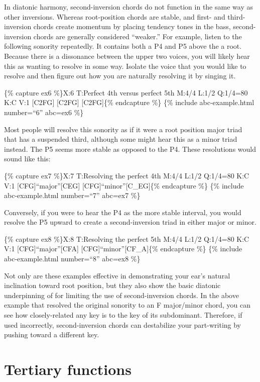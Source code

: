 \documentclass{book}
\begin{document}
In diatonic harmony, second-inversion chords do not function in the same way
as other inversions. Whereas root-position chords are stable, and first- and
third-inversion chords create momentum by placing tendency tones in the bass,
second-inversion chords are generally considered ``weaker.'' For example,
listen to the following sonority repeatedly. It contains both a P4 and P5
above the a root. Because there is a dissonance between the upper two voices,
you will likely hear this as wanting to resolve in some way. Isolate the voice
that you would like to resolve and then figure out how you are naturally
resolving it by singing it.

\{\% capture ex6 \%\}X:6 T:Perfect 4th versus perfect 5th M:4/4 L:1/2 Q:1/4=80
K:C V:1 {[}C2FG{]}\textbar{} {[}C2FG{]}\textbar{} {[}C2FG{]}\textbar{]}\{\%
endcapture \%\} \{\% include abc-example.html number=``6'' abc=ex6 \%\}

Most people will resolve this sonority as if it were a root position major
triad that has a suspended third, although some might hear this as a minor
triad instead. The P5 seems more stable as opposed to the P4. These
resolutions would sound like this:

\{\% capture ex7 \%\}X:7 T:Resolving the perfect 4th M:4/4 L:1/2 Q:1/4=80 K:C
V:1 {[}CFG{]}``major''{[}CEG{]}\textbar{}
{[}CFG{]}``minor''{[}C\_EG{]}\textbar{]}\{\% endcapture \%\} \{\% include
abc-example.html number=``7'' abc=ex7 \%\}

Conversely, if you were to hear the P4 as the more stable interval, you would
resolve the P5 upward to create a second-inversion triad in either major or
minor.

\{\% capture ex8 \%\}X:8 T:Resolving the perfect 5th M:4/4 L:1/2 Q:1/4=80 K:C
V:1 {[}CFG{]}``major''{[}CFA{]}\textbar{}
{[}CFG{]}``minor''{[}CF\_A{]}\textbar{]}\{\% endcapture \%\} \{\% include
abc-example.html number=``8'' abc=ex8 \%\}

Not only are these examples effective in demonstrating your ear's natural
inclination toward root position, but they also show the basic diatonic
underpinning of for limiting the use of second-inversion chords. In the above
example that resolved the original sonority to an F major/minor chord, you can
see how closely-related any key is to the key of its subdominant. Therefore,
if used incorrectly, second-inversion chords can destabilize your part-writing
by pushing toward a different key.

\hypertarget{tertiary-functions}{%
\section{Tertiary functions}\label{tertiary-functions}}
\end{document}
